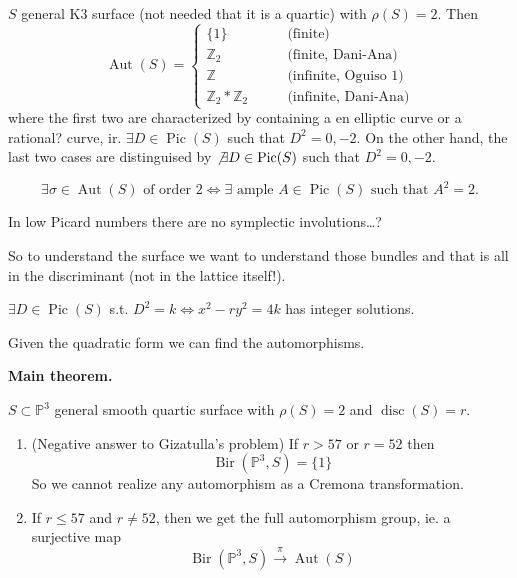 \begin{proposition}
	$S$ general K3 surface (not needed that it
	is a quartic) with $\rho(S)=2$. Then
	$$\operatorname{Aut}(S)=\begin{cases}
		\{1\}\qquad &\text{(finite)}  \\
		\mathbb{Z}_2\qquad &\text{(finite,
		Dani-Ana)} \\
		\mathbb{Z}\qquad&\text{(infinite, Oguiso
		1)}  \\
		\mathbb{Z}_2*\mathbb{Z}_2\qquad
		&\text{(infinite, Dani-Ana)}
	\end{cases}$$
	where the first two are characterized by
	containing a en elliptic curve or a
	rational? curve, ir. $\exists
	D\in\operatorname{Pic}(S)$ such that
	$D^2=0,-2$. On the other hand, the last two
	cases are distinguised by $\not\exists
	D\in\operatorname{Pic}(S)$ such that
	$D^2=0,-2$.

	$$\exists
	\sigma\in\operatorname{Aut}(S)\text{ of
	order 2}\iff \exists  \text{ ample
	}A\in\operatorname{Pic}(S) \text{ such that
	}A^2=2.$$
\end{proposition}

\begin{remark}
	In low Picard numbers there are no
	symplectic involutions…?
\end{remark}

So to understand the surface we want to
understand those bundles and that is all in
the discriminant (not in the lattice
itself!).

\begin{remark}
	$\exists D\in\operatorname{Pic}(S)$ s.t.
	$D^2=k \iff x^2-ry^2=4k$  has integer
	solutions.
\end{remark}

Given the quadratic form we can find the
automorphisms.

\medskip\noindent
\textbf{Main theorem.}

\begin{theorem}\leavevmode
	$S\subset \mathbb{P}^3$ general smooth
	quartic surface with $\rho(S)=2$ and
	$\operatorname{disc}(S)=r$.
\begin{enumerate}
	\item (Negative answer to Gizatulla's
	problem) If $r>57$ or  $r=52$ then
		 $$
		 \operatorname{Bir}(\mathbb{P}^3,S)=\{1\}
		 $$
		 So we cannot realize any automorphism as a
		 Cremona transformation.

	\item If $r\leq 57$ and $r \neq 52$, then we
	get the full automorphism group, ie. a
	surjective map
		$$
		\operatorname{Bir}(\mathbb{P}^3,S)
		\overset{\pi}{\longrightarrow}
		\operatorname{Aut}(S)
		$$
\end{enumerate}
\end{theorem}


